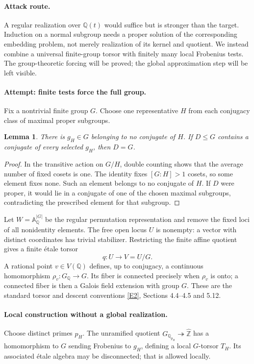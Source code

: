 \documentclass[11pt,a4paper]{article}
\newcommand{\Z}{\mathbb{Z}}
\newcommand{\Q}{\mathbb{Q}}
\newcommand{\A}{\mathbb{A}}
\newcommand{\eref}[2]{\hyperlink{extra:#1:#2}{[E#2]}}
\newtheorem{notebooklemma}{Lemma}[section]
\numberwithin{equation}{section}
\begin{document}
\paragraph{Attack route.}
A regular realization over $\Q(t)$ would suffice but is stronger than the target. Induction on a normal subgroup needs a proper solution of the corresponding embedding problem, not merely realization of its kernel and quotient. We instead combine a universal finite-group torsor with finitely many local Frobenius tests. The group-theoretic forcing will be proved; the global approximation step will be left visible.

\paragraph{Attempt: finite tests force the full group.}
Fix a nontrivial finite group $G$. Choose one representative $H$ from each conjugacy class of maximal proper subgroups.
\begin{notebooklemma}\label{r61:derangement}
There is $g_H\in G$ belonging to no conjugate of $H$. If $D\le G$ contains a conjugate of every selected $g_H$, then $D=G$.
\end{notebooklemma}
\begin{proof}
In the transitive action on $G/H$, double counting shows that the average number of fixed cosets is one. The identity fixes $[G:H]>1$ cosets, so some element fixes none. Such an element belongs to no conjugate of $H$. If $D$ were proper, it would lie in a conjugate of one of the chosen maximal subgroups, contradicting the prescribed element for that subgroup.
\end{proof}

Let $W=\A^{|G|}_{\Q}$ be the regular permutation representation and remove the fixed loci of all nonidentity elements. The free open locus $U$ is nonempty: a vector with distinct coordinates has trivial stabilizer. Restricting the finite affine quotient gives a finite étale torsor
\[
 q:U\longrightarrow V=U/G.
\]
A rational point $v\in V(\Q)$ defines, up to conjugacy, a continuous homomorphism $\rho_v:G_{\Q}\to G$. Its fiber is connected precisely when $\rho_v$ is onto; a connected fiber is then a Galois field extension with group $G$. These are the standard torsor and descent conventions \eref{20}{2}, Sections 4.4--4.5 and 5.12.

\paragraph{Local construction without a global realization.}
Choose distinct primes $p_H$. The unramified quotient $G_{\Q_{p_H}}\twoheadrightarrow\widehat{\Z}$ has a homomorphism to $G$ sending Frobenius to $g_H$, defining a local $G$-torsor $T_H$. Its associated étale algebra may be disconnected; that is allowed locally.
\end{document}
